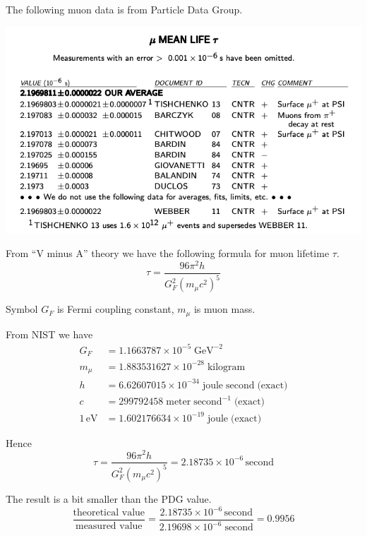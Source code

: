 \documentclass[12pt]{article}
\begin{document}
\noindent
The following muon data is from Particle Data Group.%

\begin{center}
\includegraphics[scale=0.5]{muon-mean-life.png}
\end{center}

\noindent
From ``V minus A'' theory we have the following formula for muon lifetime $\tau$.
\begin{equation*}
\tau=\frac{96\pi^2h}{G_F^2\left(m_\mu c^2\right)^5}
\end{equation*}

\noindent
Symbol $G_F$ is Fermi coupling constant, $m_\mu$ is muon mass.

\bigskip
\noindent
From NIST we have
\begin{align*}
G_F&=1.1663787\times10^{-5}\;\text{GeV}^{-2}
\\
m_\mu&=1.883531627\times10^{-28}\;\text{kilogram}
\\
h&=6.62607015\times10^{-34}\;\text{joule}\;\text{second}\;\text{(exact)}
\\
c&=299792458\;\text{meter}\;\text{second}^{-1}\;\text{(exact)}
\\
1\,\text{eV}&=1.602176634\times10^{-19}\;\text{joule}\;\text{(exact)}
\end{align*}

\noindent
Hence
\begin{equation*}
\tau=\frac{96\pi^2h}{G_F^2\left(m_\mu c^2\right)^5}
=2.18735\times10^{-6}\,\text{second}
\end{equation*}

\noindent
The result is a bit smaller than the PDG value.
\begin{equation*}
\frac{\text{theoretical value}}{\text{measured value}}
=\frac{2.18735\times10^{-6}\,\text{second}}{2.19698\times10^{-6}\;\text{second}}=0.9956
\end{equation*}
\end{document}
